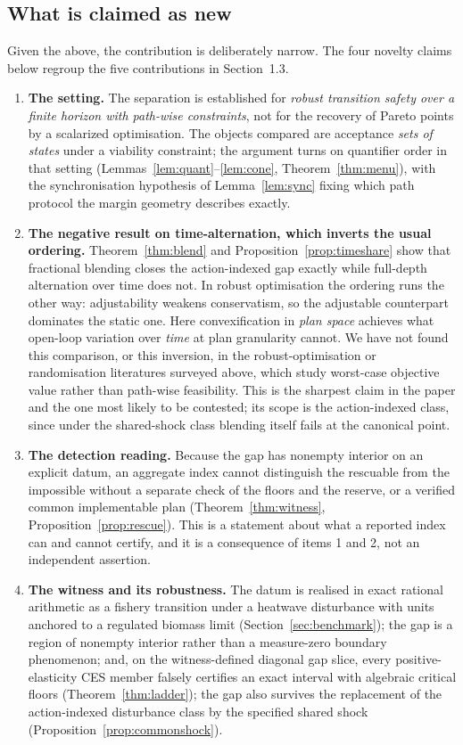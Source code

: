 \documentclass[preprint,11pt,authoryear]{elsarticle}
\theoremstyle{definition}
\theoremstyle{remark}
\begin{document}
\subsection{What is claimed as new}\label{sec:whatisnew}

Given the above, the contribution is deliberately narrow. The four novelty claims below regroup the five contributions in Section~1.3.
\begin{enumerate}[leftmargin=2em]
\item \textbf{The setting.} The separation is established for \emph{robust transition safety over a finite horizon with path-wise constraints}, not for the recovery of Pareto points by a scalarized optimisation. The objects compared are acceptance \emph{sets of states} under a viability constraint; the argument turns on quantifier order in that setting (Lemmas~\ref{lem:quant}--\ref{lem:cone}, Theorem~\ref{thm:menu}), with the synchronisation hypothesis of Lemma~\ref{lem:sync} fixing which path protocol the margin geometry describes exactly.
\item \textbf{The negative result on time-alternation, which inverts the usual ordering.} Theorem~\ref{thm:blend} and Proposition~\ref{prop:timeshare} show that fractional blending closes the action-indexed gap exactly while full-depth alternation over time does not. In robust optimisation the ordering runs the other way: adjustability weakens conservatism, so the adjustable counterpart dominates the static one. Here convexification in \emph{plan space} achieves what open-loop variation over \emph{time} at plan granularity cannot. We have not found this comparison, or this inversion, in the robust-optimisation or randomisation literatures surveyed above, which study worst-case objective value rather than path-wise feasibility. This is the sharpest claim in the paper and the one most likely to be contested; its scope is the action-indexed class, since under the shared-shock class blending itself fails at the canonical point.
\item \textbf{The detection reading.} Because the gap has nonempty interior on an explicit datum, an aggregate index cannot distinguish the rescuable from the impossible without a separate check of the floors and the reserve, or a verified common implementable plan (Theorem~\ref{thm:witness}, Proposition~\ref{prop:rescue}). This is a statement about what a reported index can and cannot certify, and it is a consequence of items 1 and 2, not an independent assertion.
\item \textbf{The witness and its robustness.} The datum is realised in exact rational arithmetic as a fishery transition under a heatwave disturbance with units anchored to a regulated biomass limit (Section~\ref{sec:benchmark}); the gap is a region of nonempty interior rather than a measure-zero boundary phenomenon; and, on the witness-defined diagonal gap slice, every positive-elasticity CES member falsely certifies an exact interval with algebraic critical floors (Theorem~\ref{thm:ladder}); the gap also survives the replacement of the action-indexed disturbance class by the specified shared shock (Proposition~\ref{prop:commonshock}).
\end{enumerate}
\end{document}
